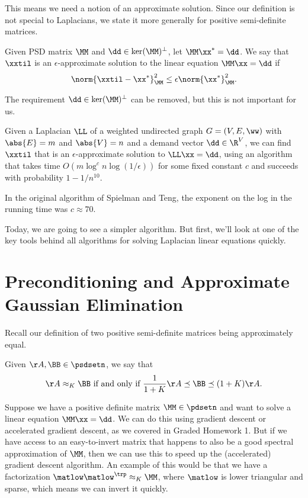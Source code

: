 This means we need a notion of an approximate solution.
Since our definition is not special to Laplacians, we state it more
generally for positive semi-definite matrices.
\begin{definition}
  Given PSD matrix $\MM$ and $\dd \in \ker(\MM)^{\perp}$, let
  $\MM \xx^* = \dd$.
  We say that $\xxtil$ is an $\epsilon$-approximate solution to the
  linear equation $\MM \xx = \dd$ if
  \[
    \norm{\xxtil - \xx^*}_{\MM}^2 \leq \epsilon \norm{\xx^*}_{\MM}^2.
  \]
\end{definition}

\begin{remark}
  The requirement $\dd \in \ker(\MM)^{\perp}$ can be removed,
   but this is not important for us.
 \end{remark}

\begin{theorem}
Given a Laplacian $\LL$ of a weighted undirected graph $G = (V,E,\ww)$
with $\abs{E}=m$ and $\abs{V} = n$ and a demand vector $\dd \in \R^V$,
we can find $\xxtil$ that is an $\epsilon$-approximate solution to
$\LL \xx = \dd$, using an algorithm that takes time
$O(m \log^c n \log(1/\epsilon))$ for some fixed constant $c$ and succeeds with probability $1 - 1/n^{10}$.
\end{theorem}
In the original algorithm of Spielman and Teng, the exponent on the
log in the running time was $c \approx 70$.

Today, we are going to see a simpler algorithm. But first, we'll look
at one of the key tools behind all algorithms for solving Laplacian
linear equations quickly.


\section{Preconditioning and
Approximate Gaussian Elimination}
Recall our definition of two positive semi-definite matrices being
approximately equal.
\begin{definition}
  Given $\AA, \BB \in \psdsetn$, we say that
  \[
    \AA \approx_{K} \BB
    \text{ if and only if }
    \frac{1}{1+ K} \AA \preceq \BB \preceq (1+ K) \AA.
    \]
\end{definition}
Suppose we have a positive definite matrix $\MM \in \pdsetn$ and want to
solve a linear equation $\MM \xx =\dd$.
We can do this using gradient descent or accelerated gradient
descent, as we covered in Graded Homework 1.
But if we have access to an easy-to-invert matrix that happens to also
be a good spectral approximation of $\MM$, then we can use this to
speed up the (accelerated) gradient descent algorithm.
An example of this would be that we have a factorization
$\matlow\matlow^{\trp} \approx_{K} \MM$, where $\matlow$ is
lower triangular and sparse, which means we can invert it quickly.

